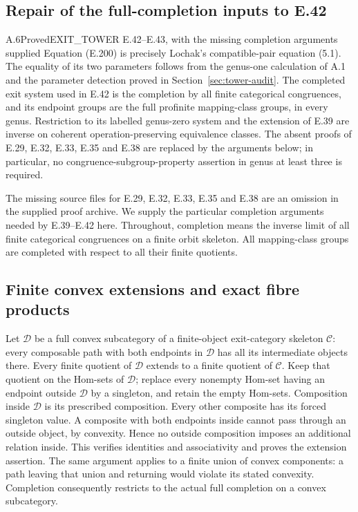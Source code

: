 \subsection{Repair of the full-completion inputs to E.42}
\label{sec:completion-repair}

\begin{result}{A.6}{Proved}{EXIT\_TOWER E.42--E.43, with the missing completion arguments supplied}
Equation (E.200) is precisely Lochak's compatible-pair equation (5.1).
The equality of its two parameters follows from the genus-one calculation
of A.1 and the parameter detection proved in Section~\ref{sec:tower-audit}.
The completed exit system used in E.42 is the completion by all finite
categorical congruences, and its endpoint groups are the full profinite
mapping-class groups, in every genus.  Restriction to its labelled
genus-zero system and the extension of E.39 are inverse on coherent
operation-preserving equivalence classes.  The absent proofs of E.29,
E.32, E.33, E.35 and E.38 are replaced by the arguments below; in
particular, no congruence-subgroup-property assertion in genus at
least three is required.
\end{result}

The missing source files for E.29, E.32, E.33, E.35 and E.38 are an
omission in the supplied proof archive.  We supply the particular
completion arguments needed by E.39--E.42 here.  Throughout, completion
means the inverse limit of all finite categorical congruences on a
finite orbit skeleton.  All mapping-class groups are completed with
respect to all their finite quotients.

\subsection{Finite convex extensions and exact fibre products}

Let $\mathcal D$ be a full convex subcategory of a finite-object
exit-category skeleton $\mathcal C$: every composable path with both
endpoints in $\mathcal D$ has all its intermediate objects there.
Every finite quotient of $\mathcal D$ extends to a finite quotient
of $\mathcal C$.  Keep that quotient on the Hom-sets of $\mathcal D$;
replace every nonempty Hom-set having an endpoint outside
$\mathcal D$ by a singleton, and retain the empty Hom-sets.
Composition inside $\mathcal D$ is its prescribed composition.
Every other composite has its forced singleton value.  A composite
with both endpoints inside cannot pass through an outside object,
by convexity.  Hence no outside composition imposes an additional
relation inside.  This verifies identities and associativity and
proves the extension assertion.  The same argument applies to a finite
union of convex components: a path leaving that union and returning
would violate its stated convexity.  Completion consequently restricts
to the actual full completion on a convex subcategory.

